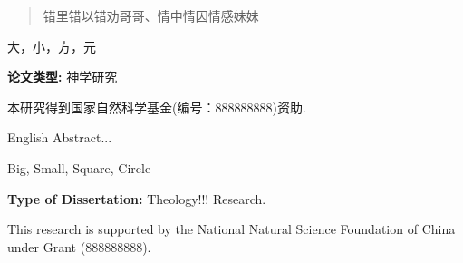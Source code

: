 \fancyhead[C]{\leftmark}
\fancyhead[CO]{\leftmark} %

\begin{abstract}
错里错以错劝哥哥、情中情因情感妹妹
\end{abstract}

\begin{keywords}
大，小，方，元
\end{keywords}

\vspace{\baselineskip} %
\noindent %
\textbf{\fontsize{12}{14}\selectfont 论文类型: }神学研究

\vspace{1.5\baselineskip} %
\noindent %
本研究得到国家自然科学基金(编号：888888888)资助.
\cleardoublepage


\fancyhead[C]{\leftmark}
\fancyhead[CO]{\leftmark} %

\begin{englishabstract}
English Abstract...
\end{englishabstract}

\begin{englishkeywords}
Big, Small, Square, Circle
\end{englishkeywords}

\vspace{\baselineskip} %
\noindent %
\textbf{\fontsize{12}{14}\selectfont Type of Dissertation: }Theology!!! Research.

\vspace{1.5\baselineskip} %
\noindent %
This research is supported by the National Natural Science Foundation of China under Grant (888888888).
\cleardoublepage
